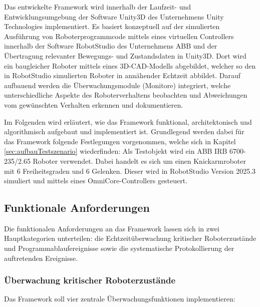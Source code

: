 Das entwickelte Framework wird innerhalb der Laufzeit- und
Entwicklungsumgebung der Software Unity3D des
Unternehmens Unity Technologies implementiert. Es basiert konzeptuell auf
der simulierten Ausführung von Roboterprogrammcode mittels eines virtuellen
Controllers innerhalb der Software RobotStudio des Unternehmens
ABB und der Übertragung relevanter Bewegungs- und Zustandsdaten in
Unity3D. Dort wird ein baugleicher Roboter mittels eines
3D-CAD-Modells abgebildet, welcher so den in RobotStudio simulierten
Roboter in annähender Echtzeit abbildet. Darauf aufbauend werden die
Überwachungsmodule (Monitore) integriert, welche unterschiedliche
Aspekte des Roboterverhaltens beobachten und Abweichungen vom gewünschten
Verhalten erkennen und dokumentieren.

Im Folgenden wird erläutert, wie das Framework funktional, architektonisch und
algorithmisch aufgebaut und implementiert ist. Grundlegend werden
dabei für das Framework folgende Festlegungen vorgenommen, welche
sich in Kapitel \ref{sec:aufbauTestszenario} wiederfinden: Als
Testobjekt wird ein ABB IRB 6700-235/2.65 Roboter verwendet. Dabei handelt es
sich um einen Knickarmroboter mit 6 Freiheitsgraden und 6
Gelenken. Dieser wird in RobotStudio Version 2025.3
simuliert und mittels eines OmniCore-Controllers gesteuert.

\subsection{Funktionale Anforderungen}

Die funktionalen Anforderungen an das Framework
lassen sich in zwei Hauptkategorien unterteilen: die Echtzeitüberwachung
kritischer Roboterzustände und Programmablaufereignisse sowie die
systematische Protokollierung der auftretenden Ereignisse.

\subsubsection{Überwachung kritischer Roboterzustände}

Das Framework soll vier zentrale Überwachungsfunktionen implementieren:

